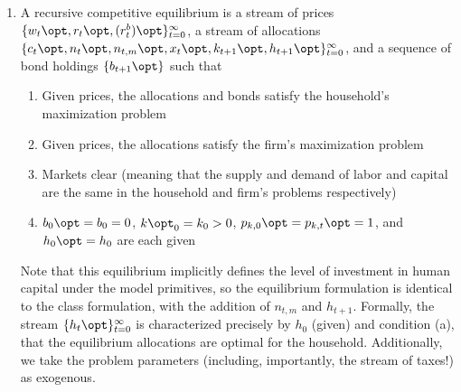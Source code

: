 \documentclass[10pt]{article}
\begin{document}
\begin{enumerate}
	\item A recursive competitive equilibrium is a stream of prices $\{w_t\opt,r_t\opt,(r_t^b)\opt\}_{t=0}^\infty$, a stream of allocations $\{c_t\opt,n_t\opt,n_{t,m}\opt,x_t\opt,k_{t+1}\opt,h_{t+1}\opt\}_{t=0}^\infty$, and a sequence of bond holdings $\{b_{t+1}\opt\}$ such that \begin{enumerate} \item Given prices, the allocations and bonds satisfy the household's maximization problem \item Given prices, the allocations satisfy the firm's maximization problem \item Markets clear (meaning that the supply and demand of labor and capital are the same in the household and firm's problems respectively) \item $b_0\opt = b_0 = 0$, $k\opt_0 = k_0 > 0$, $p_{k,0}\opt = p_{k,t}\opt = 1$, and $h_0\opt = h_0$ are each given \end{enumerate}Note that this equilibrium implicitly defines the level of investment in human capital under the model primitives, so the equilibrium formulation is identical to the class formulation, with the addition of $n_{t,m}$ and $h_{t+1}$. Formally, the stream $\{h_t\opt\}_{t=0}^\infty$ is characterized precisely by $h_0$ (given) and condition (a), that the equilibrium allocations are optimal for the household. Additionally, we take the problem parameters (including, importantly, the stream of taxes!) as exogenous.

\end{enumerate}
\end{document}
